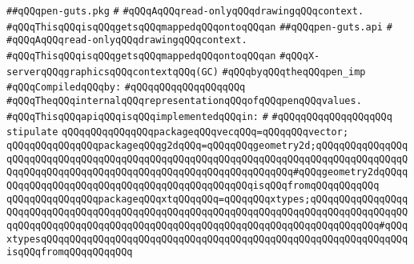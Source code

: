 \label{src/lib/x-kit/xclient/src/window/pen-guts.api}
\verb|##qQQqpen-guts.pkg|\newline
\verb|#|\newline
\verb|#qQQqAqQQqread-onlyqQQqdrawingqQQqcontext.|\newline
\verb|#qQQqThisqQQqisqQQqgetsqQQqmappedqQQqontoqQQqan|\newline
\verb|##qQQqpen-guts.api|\newline
\verb|#|\newline
\verb|#qQQqAqQQqread-onlyqQQqdrawingqQQqcontext.|\newline
\verb|#qQQqThisqQQqisqQQqgetsqQQqmappedqQQqontoqQQqan|\newline
\verb|#qQQqX-serverqQQqgraphicsqQQqcontextqQQq(GC)|\newline
\verb|#qQQqbyqQQqtheqQQqpen_imp|\newline
\newline
\verb|#qQQqCompiledqQQqby:|\newline
\verb|#qQQqqQQqqQQqqQQqqQQq|\newline
\newline
\newline
\newline
\verb|#qQQqTheqQQqinternalqQQqrepresentationqQQqofqQQqpenqQQqvalues.|\newline
\newline
\verb|#qQQqThisqQQqapiqQQqisqQQqimplementedqQQqin:|\newline
\verb|#|\newline
\verb|#qQQqqQQqqQQqqQQqqQQq|\newline
\newline
\verb|stipulate|\newline
\verb|qQQqqQQqqQQqqQQqpackageqQQqvecqQQq=qQQqqQQqvector;|\newline
\verb|qQQqqQQqqQQqqQQqpackageqQQqg2dqQQq=qQQqqQQqgeometry2d;qQQqqQQqqQQqqQQqqQQqqQQqqQQqqQQqqQQqqQQqqQQqqQQqqQQqqQQqqQQqqQQqqQQqqQQqqQQqqQQqqQQqqQQqqQQqqQQqqQQqqQQqqQQqqQQqqQQqqQQqqQQqqQQqqQQqqQQq#qQQqgeometry2dqQQqqQQqqQQqqQQqqQQqqQQqqQQqqQQqqQQqqQQqqQQqqQQqisqQQqfromqQQqqQQqqQQq|\newline
\verb|qQQqqQQqqQQqqQQqpackageqQQqxtqQQqqQQq=qQQqqQQqxtypes;qQQqqQQqqQQqqQQqqQQqqQQqqQQqqQQqqQQqqQQqqQQqqQQqqQQqqQQqqQQqqQQqqQQqqQQqqQQqqQQqqQQqqQQqqQQqqQQqqQQqqQQqqQQqqQQqqQQqqQQqqQQqqQQqqQQqqQQqqQQqqQQqqQQqqQQq#qQQqxtypesqQQqqQQqqQQqqQQqqQQqqQQqqQQqqQQqqQQqqQQqqQQqqQQqqQQqqQQqqQQqqQQqisqQQqfromqQQqqQQqqQQq|\newline
